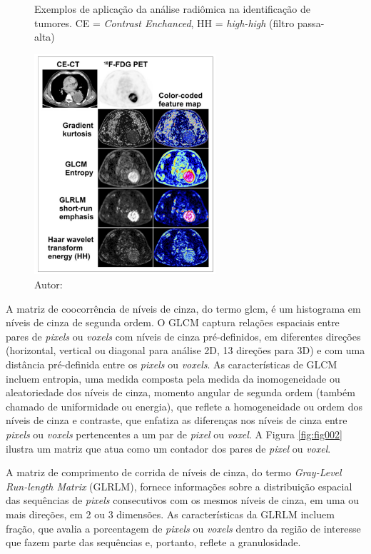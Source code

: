 \begin{figure}[htbp]
    \centering
    \caption{Exemplos de aplicação da análise radiômica na identificação de tumores. 
    \newline CE = \textit{Contrast Enchanced}, HH = \textit{high-high} (filtro passa-alta)}
    \includegraphics[width=0.6\textwidth]{figures/fig001.png}
    \caption*{Autor: \cite{mayerhoeferIntroductionRadiomics2020}}
    \label{fig:fig001}
\end{figure}

 A matriz de coocorrência de níveis de cinza, do termo \gls{glcm}, é um histograma em níveis de cinza de segunda ordem. O GLCM captura relações espaciais entre pares de \textit{pixels} ou \textit{voxels} com níveis de cinza pré-definidos, em diferentes direções (horizontal, vertical ou diagonal para análise 2D, 13 direções para 3D) e com uma distância pré-definida entre os \textit{pixels} ou \textit{voxels}. As características de GLCM incluem entropia, uma medida composta pela medida da inomogeneidade ou aleatoriedade dos níveis de cinza, momento angular de segunda ordem (também chamado de uniformidade ou energia), que reflete a homogeneidade ou ordem dos níveis de cinza e contraste, que enfatiza as diferenças nos níveis de cinza entre \textit{pixels} ou \textit{voxels} pertencentes a um par de \textit{pixel} ou \textit{voxel}. A Figura \ref{fig:fig002} ilustra um matriz que atua como um contador dos pares de \textit{pixel} ou \textit{voxel}.

 A matriz de comprimento de corrida de níveis de cinza, do termo 
 \textit{Gray-Level Run-length Matrix} (GLRLM), fornece informações sobre a distribuição espacial das sequências de \textit{pixels} consecutivos com os mesmos níveis de cinza, em uma ou mais direções, em 2 ou 3 dimensões. As características da GLRLM incluem fração, que avalia a porcentagem de \textit{pixels} ou \textit{voxels} dentro da região de interesse que fazem parte das sequências e, portanto, reflete a granulosidade. 

